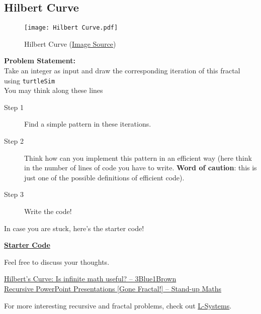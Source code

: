 \subsection{Hilbert Curve}{\label{pp:hilbertcurve}}
\begin{figure}[H]
	\centering
	\texttt{[image: Hilbert Curve.pdf]}
	\caption{Hilbert Curve (\href{https://www.cse.iitb.ac.in/~ranade/book.html}{Image Source})}
	\label{fig:hilbertcurve}
\end{figure}
\textbf{Problem Statement:}\\
Take an integer as input and draw the corresponding iteration of this fractal using \verb!turtleSim!\\
You may think along these lines
\begin{description}
	\item[Step 1]Find a simple pattern in these iterations.
	\item[Step 2]Think how can you implement this pattern in an efficient way (here think in the number of lines of code you have to write. \textbf{Word of caution}: this is just one of the possible definitions of efficient code).
	\item[Step 3]Write the code!
\end{description}
In case you are stuck, here's the starter code!
\begin{tcolorbox}%
	\href{https://github.com/paramrathour/CS-101/tree/main/Starter Codes/Hilbert Curve.cpp}{\textbf{Starter Code}}
\end{tcolorbox}
Feel free to discuss your thoughts.
\begin{funvideo}
\href{https://youtu.be/3s7h2MHQtxc}{Hilbert's Curve: Is infinite math useful? -- 3Blue1Brown}\\
\href{https://youtu.be/b-Fa6HtvGtQ}{Recursive PowerPoint Presentations [Gone Fractal!] -- Stand-up Maths}	
\end{funvideo}
For more interesting recursive and fractal problems, check out \hyperref[pp:lsystems]{L-Systems}.